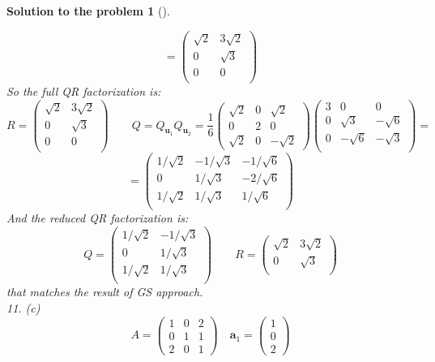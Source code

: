\documentclass[12pt,a4]{article}
\newtheorem{solution}{Solution to the problem}
\newcommand{\ba}{{\mathbf a}}
\newcommand{\bu}{{\mathbf u}}
\begin{document}
\begin{solution}[]
\begin{enumerate}[(a)]
\[=
\begin{pmatrix}
\sqrt 2 & 3\sqrt 2 \\
0 & \sqrt 3 \\
0 & 0 \\
\end{pmatrix}
\]
So the full QR factorization is:
\[
R = 
\begin{pmatrix}
\sqrt 2 & 3\sqrt 2 \\
0 & \sqrt 3 \\
0 & 0 \\
\end{pmatrix}
\qquad
Q = Q_{\bu_1} Q_{\bu_2} = 
\frac{1}{6}
\begin{pmatrix}
\sqrt 2 & 0 & \sqrt 2\\
0 & 2 & 0 \\
\sqrt 2 & 0  & -\sqrt 2
\end{pmatrix}
\begin{pmatrix}
3 & 0 & 0 \\
0 & \sqrt 3 & - \sqrt 6 \\
0 &  -\sqrt 6 & - \sqrt 3\\
\end{pmatrix}
=
\]
\[
=
\begin{pmatrix} 
1/\sqrt 2 & -1/\sqrt 3 & - 1/ \sqrt 6 \\
0 & 1/\sqrt 3 & - 2/ \sqrt 6 \\
1/\sqrt 2 & 1/\sqrt 3  & 1/\sqrt 6 \\
\end{pmatrix}
\]
And the reduced QR factorization is:
\[
Q =
\begin{pmatrix} 
1/\sqrt 2 & -1/\sqrt 3\\
0 & 1/\sqrt 3 \\
1/\sqrt 2 & 1/\sqrt 3 \\
\end{pmatrix}
\qquad
R = 
\begin{pmatrix}
\sqrt 2 & 3\sqrt 2 \\
0 & \sqrt 3 \\
\end{pmatrix}
\]
that matches the result of GS approach.\\
11. (c)
\[
A =
\begin{pmatrix}
1 & 0 & 2 \\
0 & 1 & 1 \\
2 & 0 & 1
\end{pmatrix}
\quad
\ba_1 = \begin{pmatrix} 1 \\ 0  \\ 2  \end{pmatrix}
\]
\end{enumerate}
\end{solution}
\end{document}
